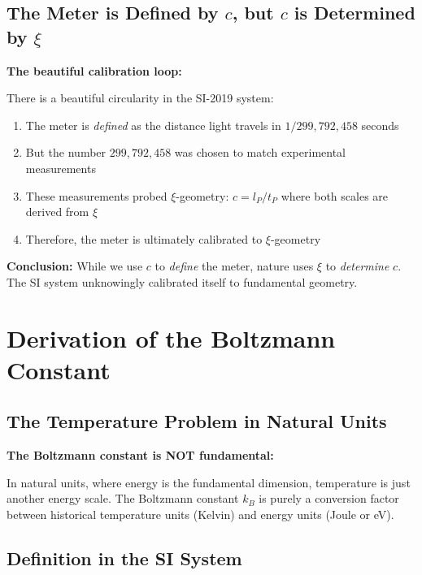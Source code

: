 \documentclass[12pt,a4paper]{article}
\begin{document}
	\subsection{The Meter is Defined by $c$, but $c$ is Determined by $\xi$}
	
	\begin{insight}
		\textbf{The beautiful calibration loop:}
		
		There is a beautiful circularity in the SI-2019 system:
		
		\begin{enumerate}
			\item The meter is \emph{defined} as the distance light travels in $1/299,792,458$ seconds
			\item But the number $299,792,458$ was chosen to match experimental measurements
			\item These measurements probed $\xi$-geometry: $c = l_P/t_P$ where both scales are derived from $\xi$
			\item Therefore, the meter is ultimately calibrated to $\xi$-geometry
		\end{enumerate}
		
		\textbf{Conclusion:} While we use $c$ to \emph{define} the meter, nature uses $\xi$ to \emph{determine} $c$. The SI system unknowingly calibrated itself to fundamental geometry.
	\end{insight}
	
	\section{Derivation of the Boltzmann Constant}
	
	\subsection{The Temperature Problem in Natural Units}
	
	\begin{warning}
		\textbf{The Boltzmann constant is NOT fundamental:}
		
		In natural units, where energy is the fundamental dimension, temperature is just another energy scale. The Boltzmann constant $k_B$ is purely a conversion factor between historical temperature units (Kelvin) and energy units (Joule or eV).
	\end{warning}
	
	\subsection{Definition in the SI System}
	
\end{document}
